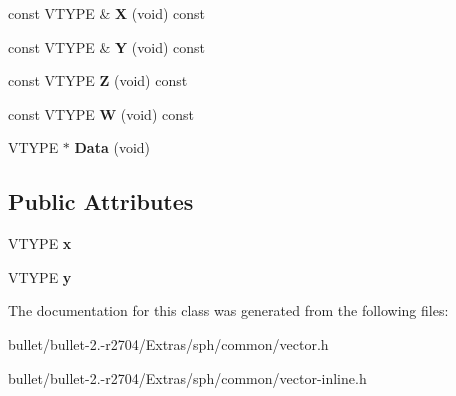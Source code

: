 \begin{DoxyCompactItemize}
\item 
\hypertarget{class_vector2_d_f_a7e3f3bbf3d07d7691e410cb0513735ca}{const V\+T\+Y\+P\+E \& {\bfseries X} (void) const }\label{class_vector2_d_f_a7e3f3bbf3d07d7691e410cb0513735ca}

\item 
\hypertarget{class_vector2_d_f_ac6ee9706b598f79b8ff8910ffa77f35f}{const V\+T\+Y\+P\+E \& {\bfseries Y} (void) const }\label{class_vector2_d_f_ac6ee9706b598f79b8ff8910ffa77f35f}

\item 
\hypertarget{class_vector2_d_f_a1ec6c71561982b9bde44c6ee5aab3ca9}{const V\+T\+Y\+P\+E {\bfseries Z} (void) const }\label{class_vector2_d_f_a1ec6c71561982b9bde44c6ee5aab3ca9}

\item 
\hypertarget{class_vector2_d_f_a8f1b30dff3057a4fc0ecada6f3a2df35}{const V\+T\+Y\+P\+E {\bfseries W} (void) const }\label{class_vector2_d_f_a8f1b30dff3057a4fc0ecada6f3a2df35}

\item 
\hypertarget{class_vector2_d_f_a2b8009d6b3761d2db838ebab1409269c}{V\+T\+Y\+P\+E $\ast$ {\bfseries Data} (void)}\label{class_vector2_d_f_a2b8009d6b3761d2db838ebab1409269c}

\end{DoxyCompactItemize}
\subsection*{Public Attributes}
\begin{DoxyCompactItemize}
\item 
\hypertarget{class_vector2_d_f_a0ea240e96c37284bd9208cb9a8765296}{V\+T\+Y\+P\+E {\bfseries x}}\label{class_vector2_d_f_a0ea240e96c37284bd9208cb9a8765296}

\item 
\hypertarget{class_vector2_d_f_a5211774c2d87f21226eab863075dc0e2}{V\+T\+Y\+P\+E {\bfseries y}}\label{class_vector2_d_f_a5211774c2d87f21226eab863075dc0e2}

\end{DoxyCompactItemize}


The documentation for this class was generated from the following files\+:\begin{DoxyCompactItemize}
\item 
bullet/bullet-\/2.-\/r2704/\+Extras/sph/common/vector.\+h\item 
bullet/bullet-\/2.-\/r2704/\+Extras/sph/common/vector-\/inline.\+h\end{DoxyCompactItemize}

